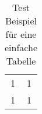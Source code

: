 \begin{table}[H]
    \begin{tabular}{c c}
        1 & 1\\
        1 & 1\\  
    \end{tabular}
    \caption{Test Beispiel für eine einfache Tabelle \label{tab:testBsp}}
\end{table}
